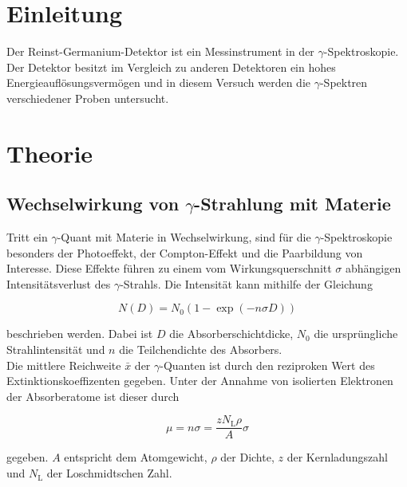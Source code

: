 \section{Einleitung} %
\label{sec:einleitung}

Der Reinst-Germanium-Detektor ist ein Messinstrument in der $\gamma$-Spektroskopie.
Der Detektor besitzt im Vergleich zu anderen Detektoren ein hohes Energieauflösungsvermögen und in diesem Versuch werden die $\gamma$-Spektren verschiedener Proben untersucht.

\section{Theorie} %
\label{sec:theorie}

\subsection{Wechselwirkung von $\gamma$-Strahlung mit Materie} %
\label{sub:wechselwirkung_von_gamma_strahlung_mit_materie}

Tritt ein $\gamma$-Quant mit Materie in Wechselwirkung, sind für die $\gamma$-Spektroskopie besonders der Photoeffekt, der Compton-Effekt und die Paarbildung von Interesse.
Diese Effekte führen zu einem vom Wirkungsquerschnitt $\sigma$ abhängigen Intensitätsverlust des $\gamma$-Strahls.
Die Intensität kann mithilfe der Gleichung

\begin{equation}
	N(D) = N_\text{0} \left(1-\exp\left(- n \sigma D\right)\right) \label{anzahl}
\end{equation}

beschrieben werden.
Dabei ist $D$ die Absorberschichtdicke, $N_\text{0}$ die ursprüngliche Strahlintensität und $n$ die Teilchendichte des Absorbers.\\

Die mittlere Reichweite $\bar{x}$ der $\gamma$-Quanten ist durch den reziproken Wert des Extinktionskoeffizenten gegeben.
Unter der Annahme von isolierten Elektronen der Absorberatome ist dieser durch

\begin{equation}
	\mu = n \sigma = \frac{z N_\text{L} \rho}{A} \sigma
\end{equation}

gegeben.
$A$ entspricht dem Atomgewicht, $\rho$ der Dichte, $z$ der Kernladungszahl und $N_\text{L}$ der Loschmidtschen Zahl.\\

